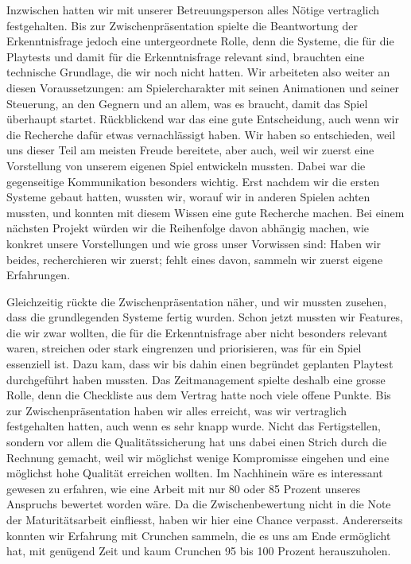 \documentclass[../Main.tex]{subfiles}
\begin{document}
Inzwischen hatten wir mit unserer Betreuungsperson alles Nötige vertraglich festgehalten. Bis zur Zwischenpräsentation spielte die Beantwortung der Erkenntnisfrage jedoch eine untergeordnete Rolle, denn die Systeme, die für die Playtests und damit für die Erkenntnisfrage relevant sind, brauchten eine technische Grundlage, die wir noch nicht hatten. Wir arbeiteten also weiter an diesen Voraussetzungen: am Spielercharakter mit seinen Animationen und seiner Steuerung, an den Gegnern und an allem, was es braucht, damit das Spiel überhaupt startet. Rückblickend war das eine gute Entscheidung, auch wenn wir die Recherche dafür etwas vernachlässigt haben. Wir haben so entschieden, weil uns dieser Teil am meisten Freude bereitete, aber auch, weil wir zuerst eine Vorstellung von unserem eigenen Spiel entwickeln mussten. Dabei war die gegenseitige Kommunikation besonders wichtig. Erst nachdem wir die ersten Systeme gebaut hatten, wussten wir, worauf wir in anderen Spielen achten mussten, und konnten mit diesem Wissen eine gute Recherche machen. Bei einem nächsten Projekt würden wir die Reihenfolge davon abhängig machen, wie konkret unsere Vorstellungen und wie gross unser Vorwissen sind: Haben wir beides, recherchieren wir zuerst; fehlt eines davon, sammeln wir zuerst eigene Erfahrungen.

Gleichzeitig rückte die Zwischenpräsentation näher, und wir mussten zusehen, dass die grundlegenden Systeme fertig wurden. Schon jetzt mussten wir Features, die wir zwar wollten, die für die Erkenntnisfrage aber nicht besonders relevant waren, streichen oder stark eingrenzen und priorisieren, was für ein Spiel essenziell ist. Dazu kam, dass wir bis dahin einen begründet geplanten Playtest durchgeführt haben mussten. Das Zeitmanagement spielte deshalb eine grosse Rolle, denn die Checkliste aus dem Vertrag hatte noch viele offene Punkte. Bis zur Zwischenpräsentation haben wir alles erreicht, was wir vertraglich festgehalten hatten, auch wenn es sehr knapp wurde. Nicht das Fertigstellen, sondern vor allem die Qualitätssicherung hat uns dabei einen Strich durch die Rechnung gemacht, weil wir möglichst wenige Kompromisse eingehen und eine möglichst hohe Qualität erreichen wollten. Im Nachhinein wäre es interessant gewesen zu erfahren, wie eine Arbeit mit nur 80 oder 85 Prozent unseres Anspruchs bewertet worden wäre. Da die Zwischenbewertung nicht in die Note der Maturitätsarbeit einfliesst, haben wir hier eine Chance verpasst. Andererseits konnten wir Erfahrung mit Crunchen sammeln, die es uns am Ende ermöglicht hat, mit genügend Zeit und kaum Crunchen 95 bis 100 Prozent herauszuholen.
\end{document}
